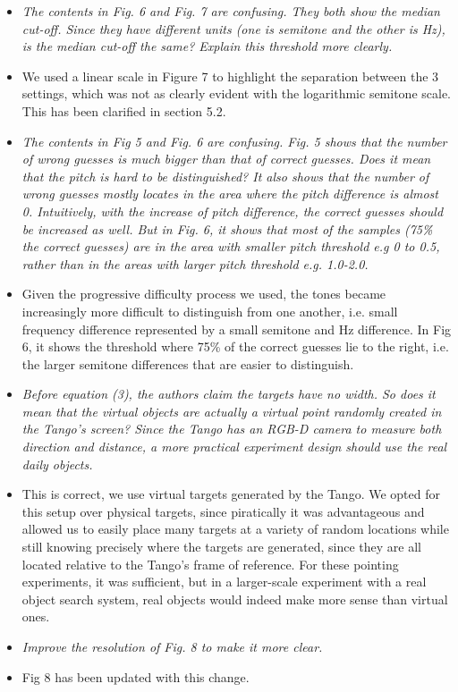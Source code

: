 \documentclass{scrartcl}
\begin{document}
\begin{itemize}
  \item \textit{The contents in Fig. 6 and Fig. 7 are confusing. They both show the median cut-off. Since they have different units (one is semitone and the other is Hz), is the median cut-off the same? Explain this threshold more clearly.}

  \item[] We used a linear scale in Figure 7 to highlight the separation between the 3 settings, which was not as clearly evident with the logarithmic semitone scale.
    This has been clarified in section 5.2.

  \item \textit{The contents in Fig 5 and Fig. 6 are confusing. Fig. 5 shows that the number of wrong guesses is much bigger than that of correct guesses. Does it mean that the pitch is hard to be distinguished? It also shows that the number of wrong guesses mostly locates in the area where the pitch difference is almost 0. Intuitively, with the increase of pitch difference, the correct guesses should be increased as well. But in Fig. 6, it shows that most of the samples (75\% the correct guesses) are in the area with smaller pitch threshold e.g 0 to 0.5, rather than in the areas with larger pitch threshold e.g. 1.0-2.0.}
  \item[] Given the progressive difficulty process we used, the tones became increasingly more difficult to distinguish from one another, i.e. small frequency difference represented by a small semitone and Hz difference.
    In Fig 6, it shows the threshold where 75\% of the correct guesses lie to the right, i.e. the larger semitone differences that are easier to distinguish. 

  \item \textit{Before equation (3), the authors claim the targets have no width. So does it mean that the virtual objects are actually a virtual point randomly created in the Tango’s screen? Since the Tango has an RGB-D camera to measure both direction and distance, a more practical experiment design should use the real daily objects.}
  \item[] This is correct, we use virtual targets generated by the Tango.
    We opted for this setup over physical targets, since piratically it was advantageous and allowed us to easily place many targets at a variety of random locations while still knowing precisely where the targets are generated, since they are all located relative to the Tango's frame of reference. 
    For these pointing experiments, it was sufficient, but in a larger-scale experiment with a real object search system, real objects would indeed make more sense than virtual ones.

  \item \textit{Improve the resolution of Fig. 8 to make it more clear.}
  \item[] Fig 8 has been updated with this change. 
\end{itemize}




\end{document}
